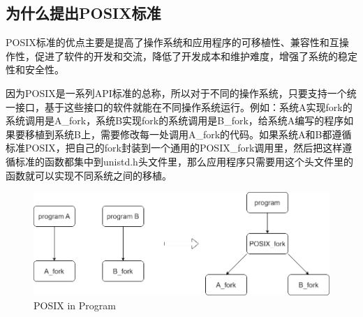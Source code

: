 \subsection{为什么提出POSIX标准} \par
POSIX标准的优点主要是提高了操作系统和应用程序的可移植性、兼容性和互操作性，促进了软件的开发和交流，降低了开发成本和维护难度，增强了系统的稳定性和安全性。\par
因为POSIX是一系列API标准的总称，所以对于不同的操作系统，只要支持一个统一接口，基于这些接口的软件就能在不同操作系统运行。例如：系统A实现fork的系统调用是A\_fork，系统B实现fork的系统调用是B\_fork，给系统A编写的程序如果要移植到系统B上，需要修改每一处调用A\_fork的代码。如果系统A和B都遵循标准POSIX，把自己的fork封装到一个通用的POSIX\_fork调用里，然后把这样遵循标准的函数都集中到unistd.h头文件里，那么应用程序只需要用这个头文件里的函数就可以实现不同系统之间的移植。

\begin{figure}[ht]
	\centering
	\includegraphics[width=\textwidth]{figures/09-01-posix in program.png}
	\caption{POSIX in Program}
	\label{fig:posix in program}
\end{figure}

\newpage
